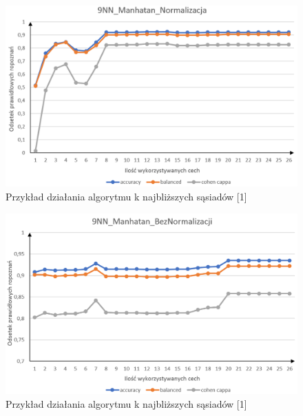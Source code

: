 \documentclass[12pt]{article}
\begin{document}
\begin{figure}[H]
	\centering
		\includegraphics[scale=0.66]{images/metrics/9nn_manhatan_norm.png}
	\caption{Przykład działania algorytmu k najbliższych sąsiadów [1]}
\end{figure}
\begin{figure}[H]
	\centering
		\includegraphics[scale=0.66]{images/metrics/9nn_manhatan_beznorm.png}
	\caption{Przykład działania algorytmu k najbliższych sąsiadów [1]}
\end{figure}

\end{document}
